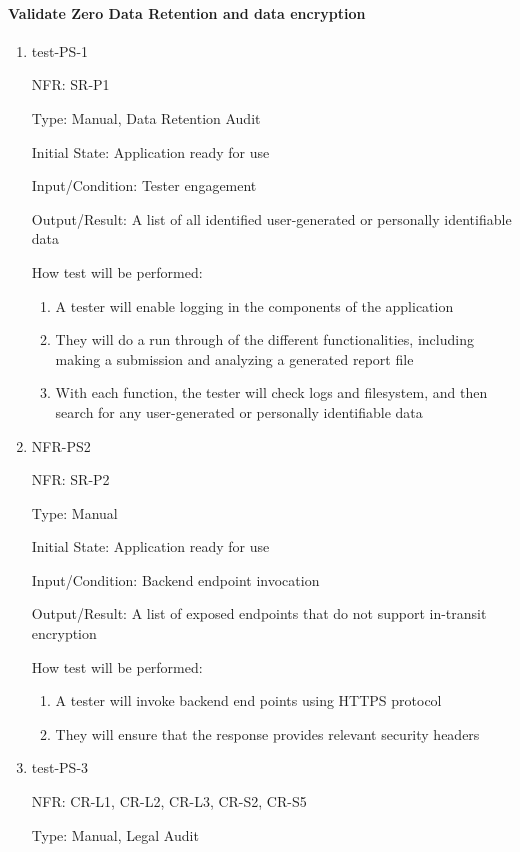 \documentclass[12pt, titlepage]{article}
\begin{document}
\paragraph{Validate Zero Data Retention and data encryption}
\begin{enumerate}
  \item{test-PS-1}
  
  NFR: SR-P1

  Type: Manual, Data Retention Audit

  Initial State: Application ready for use

  Input/Condition: Tester engagement

  Output/Result: A list of all identified user-generated or personally identifiable data

  How test will be performed:
  \begin{enumerate}
    \item A tester will enable logging in the components of the application
    \item They will do a run through of the different functionalities, including making a submission and analyzing a generated report file
    \item With each function, the tester will check logs and filesystem, and then
    search for any user-generated or personally identifiable data
  \end{enumerate}


  \item{NFR-PS2}
  
  NFR: SR-P2 

  Type: Manual 

  Initial State: Application ready for use

  Input/Condition: Backend endpoint invocation

  Output/Result: A list of exposed endpoints that do not support in-transit encryption

  How test will be performed:
  \begin{enumerate}
    \item A tester will invoke backend end points using HTTPS protocol
    \item They will ensure that the response provides relevant security headers
  \end{enumerate}


  \item{test-PS-3}
  
  NFR: CR-L1, CR-L2, CR-L3, CR-S2, CR-S5

  Type: Manual, Legal Audit


\end{enumerate}
\end{document}

